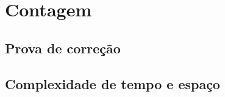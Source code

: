 \section{Contagem}
\lipsum[21]



\subsection{Prova de correção}
\lipsum[19]

\subsection{Complexidade de tempo e espaço}
\lipsum[19]